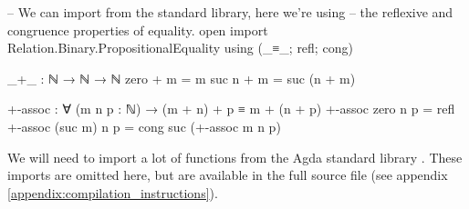 \documentclass[logo,bsc,singlespacing,parskip,online]{infthesis}
\renewenvironment{code}{\mintedcopy[breaklines,breaksymbolleft=\;]{agda}}{\endmintedcopy}
\begin{document}
\begin{code}
  -- We can import from the standard library, here we're using
  -- the reflexive and congruence properties of equality.
  open import Relation.Binary.PropositionalEquality
    using (_≡_; refl; cong)

  _+_ : ℕ → ℕ → ℕ
  zero  + m = m
  suc n + m = suc (n + m)

  +-assoc : ∀ (m n p : ℕ) → (m + n) + p ≡ m + (n + p)
  +-assoc zero    n p = refl
  +-assoc (suc m) n p = cong suc (+-assoc m n p)
\end{code}


We will need to import a lot of functions from the Agda standard library
\citep{the_agda_community_agda_2024}. These imports are omitted here, but are available in the full
source file (see appendix \ref{appendix:compilation_instructions}).
\begin{comment}
\begin{code}
-- Data types (naturals, strings, characters)
open import Data.Nat using (ℕ; zero; suc; _<_; _≥_; _≤_; _≤?_; _<?_; z≤n; s≤s; _⊔_)
  renaming (_≟_ to _≟ℕ_)
open import Data.Nat.Properties using (≤-refl; ≤-trans; ≤-<-trans; <-≤-trans; ≤-antisym; ≤-total;
  +-mono-≤; n≤1+n; m≤n⇒m≤1+n; suc-injective; <⇒≢; ≰⇒>; ≮⇒≥)
open import Data.String using (String; fromList) renaming (_≟_ to _≟str_; _++_ to _++str_;
  length to str-length; toList to ⟪_⟫)
open import Data.Char using (Char)
open import Data.Char.Properties using () renaming (_≟_ to _≟char_)
open import Data.Unit using (⊤; tt)

-- Function manipulation.
open import Function using (_∘_; flip; it; id; case_returning_of_)

-- Relations and predicates/decidability.
import Relation.Binary.PropositionalEquality as Eq
open Eq using (_≡_; _≢_; refl; sym; trans; cong; cong-app; cong₂)
open Eq.≡-Reasoning using (begin_; step-≡-∣; step-≡-⟩; _∎)
open import Relation.Binary.Definitions using (DecidableEquality)
open import Relation.Nullary.Decidable using (Dec; yes; no; True; False; toWitnessFalse;
  toWitness; fromWitness; ¬?; ⌊_⌋; From-yes)
open import Relation.Unary using (Decidable)
open import Relation.Binary using () renaming (Decidable to BinaryDecidable)
open import Relation.Nullary.Negation using (¬_; contradiction)
open import Data.Empty using (⊥-elim)

-- Products and exists quantifier.
open import Data.Product using (_×_; proj₁; proj₂; ∃-syntax) renaming (_,_ to ⟨_,_⟩)

-- Lists.
open import Data.List using (List; []; _∷_; _++_; length; filter; map; foldr; head; replicate)
open import Data.List.Properties using (≡-dec)
import Data.List.Membership.DecPropositional as DecPropMembership
open import Data.List.Relation.Unary.All using (All; all?; lookup)
  renaming (fromList to All-fromList; toList to All-toList)
open import Data.List.Relation.Unary.Any using (Any; here; there)
open import Data.List.Extrema Data.Nat.Properties.≤-totalOrder using (max; xs≤max)


\end{comment}
\end{document}
